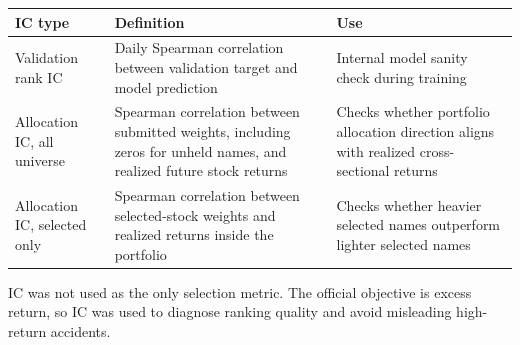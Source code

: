 \documentclass[11pt]{article}
\begin{document}
\begin{longtable}[]{@{}|
  >{\RaggedRight\arraybackslash}m{}|
  >{\RaggedRight\arraybackslash}m{}|
  >{\RaggedRight\arraybackslash}m{}|@{}}
\hline\rowcolor{tableHead}
\begin{minipage}[c]{\linewidth}\centering\bfseries
IC type
\end{minipage} & \begin{minipage}[c]{\linewidth}\centering\bfseries
Definition
\end{minipage} & \begin{minipage}[c]{\linewidth}\centering\bfseries
Use
\end{minipage} \\
\hline
\endhead
\hline
\endlastfoot
Validation rank IC & Daily Spearman correlation between validation
target and model prediction & Internal model sanity check during
training \\
\hline
Allocation IC, all universe & Spearman correlation between submitted
weights, including zeros for unheld names, and realized future stock
returns & Checks whether portfolio allocation direction aligns with
realized cross-sectional returns \\
\hline
Allocation IC, selected only & Spearman correlation between
selected-stock weights and realized returns inside the portfolio &
Checks whether heavier selected names outperform lighter selected
names \\
\end{longtable}

IC was not used as the only selection metric. The official objective is
excess return, so IC was used to diagnose ranking quality and avoid
misleading high-return accidents.
\end{document}
